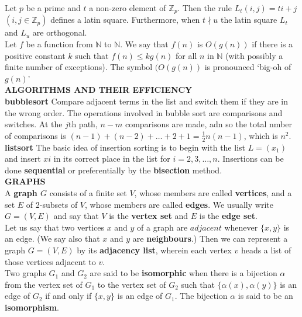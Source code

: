 \documentclass[10pt,landscape]{article}
\begin{document}
\begin{multicols}{4}
Let $p$ be a prime and $t$ a non-zero element of
$\mathbb{Z}_{p}$. Then the rule $L_{t}(i,j) =ti+j$ $(i,j \in
\mathbb{Z}_{p})$ defines a latin square. Furthermore, when $t \nmid u$
the latin square $L_{t}$ and $L_{u}$ are orthogonal.\\

Let $f$ be a function from $\mathbb{N}$ to $\mathbb{N}$. We say that
$f(n)$ is $O(g(n))$ if there is a positive constant $k$ such that
$f(n) \leq kg(n)$ for all $n$ in $\mathbb{N}$ (with possibly a finite
number of exceptions). The symbol $(O(g(n))$ is pronounced `big-oh of
$g(n)$'\\

\textbf{ALGORITHMS AND THEIR EFFICIENCY}\\

\textbf{bubblesort} Compare adjacent terms in the list and switch them
if they are in the wrong order. The operations involved in bubble sort
are comparisons and switches. At the $j$th path, $n-m$ comparisons are
made, adn so the total nmber of comparisons is $(n-1)+(n-2)+ \dots + 2
+ 1 = \frac{1}{2}n(n-1)$, which is $n^{2}$.
\textbf{listsort} The basic idea of insertion sorting is to begin with
the list $L = (x_{1})$ and insert $x{i}$ in its correct place in the
list for $i = 2,3,\dots ,n$. Insertions can be done
\textbf{sequential} or preferentially by the \textbf{bisection}
method.\\


\textbf{GRAPHS}\\

A \textbf{graph $G$} consists of a finite set $V$, whose members are
called \textbf{vertices}, and a set $E$ of 2-subsets of $V$, whose
members are called \textbf{edges}. We usually write $G = (V,E)$ and
say that $V$ is the \textbf{vertex set} and $E$ is the \textbf{edge
  set}.\\

Let us say that two vertices $x$ and $y$ of a graph are $adjacent$
whenever $\{x,y\}$ is an edge. (We say also that $x$ and $y$ are
\textbf{neighbours}.) Then we can represent a graph $G = (V,E)$ by its
\textbf{adjacency list}, wherein each vertex $v$ heads a list of those
vertices adjacent to $v$.\\

Two graphs $G_{1}$ and $G_{2}$ are said to be \textbf{isomorphic} when
there is a bijection $\alpha$ from the vertex set of $G_{1}$ to the
vertex set of $G_{2}$ such that $\{\alpha(x), \alpha(y)\}$ is an edge
of $G_{2}$ if and only if $\{x, y\}$ is an edge of $G_{1}$. The
bijection $\alpha$ is said to be an \textbf{isomorphism}.\\


\end{multicols}
\end{document}
